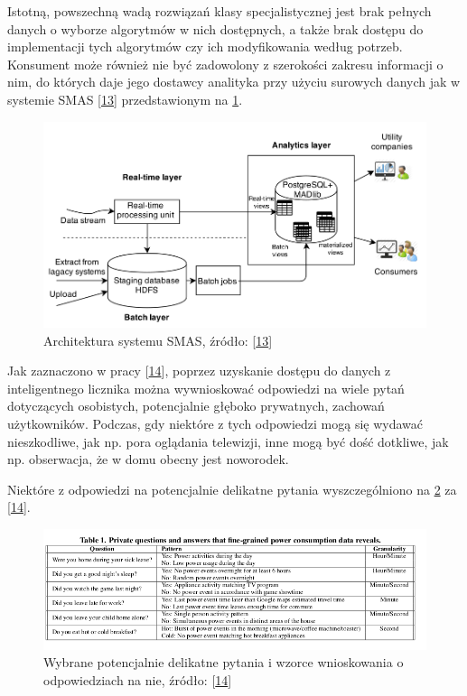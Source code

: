 Istotną, powszechną wadą rozwiązań klasy specjalistycznej jest brak
pełnych danych o wyborze algorytmów w nich dostępnych, a także brak
dostępu do implementacji tych algorytmów czy ich modyfikowania według
potrzeb. Konsument może również nie być zadowolony z szerokości zakresu
informacji o nim, do których daje jego dostawcy analityka przy użyciu
surowych danych jak w systemie SMAS
{[}\protect\hyperlink{ref-liu_smas_2015}{13}{]} przedstawionym na
\cref{fig:smas_architecture}.

\begin{figure}
\hypertarget{fig:smas_architecture}{%
\centering
\includegraphics{img/smas_architecture.png}
\caption{Architektura systemu SMAS, źródło:
{[}\protect\hyperlink{ref-liu_smas_2015}{13}{]}}\label{fig:smas_architecture}
}
\end{figure}

Jak zaznaczono w pracy
{[}\protect\hyperlink{ref-molina-markham_private_2010}{14}{]}, poprzez
uzyskanie dostępu do danych z inteligentnego licznika można wywnioskować
odpowiedzi na wiele pytań dotyczących osobistych, potencjalnie głęboko
prywatnych, zachowań użytkowników. Podczas, gdy niektóre z tych
odpowiedzi mogą się wydawać nieszkodliwe, jak np. pora oglądania
telewizji, inne mogą być dość dotkliwe, jak np. obserwacja, że w domu
obecny jest noworodek.

Niektóre z odpowiedzi na potencjalnie delikatne pytania wyszczególniono
na \cref{fig:disturbing_answers} za
{[}\protect\hyperlink{ref-molina-markham_private_2010}{14}{]}.

\begin{figure}
\hypertarget{fig:disturbing_answers}{%
\centering
\includegraphics{img/disturbing_answers.png}
\caption{Wybrane potencjalnie delikatne pytania i wzorce wnioskowania o
odpowiedziach na nie, źródło:
{[}\protect\hyperlink{ref-molina-markham_private_2010}{14}{]}}\label{fig:disturbing_answers}
}
\end{figure}

